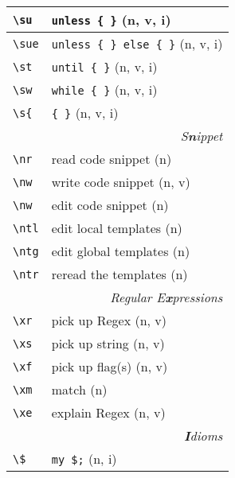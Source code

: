 \documentclass[oneside,10pt,landscape,DIV17]{scrartcl}
\begin{document}
\begin{multicols}{3}
\begin{center}
\begin{tabular}[]{|p{11mm}|p{58mm}|}
\hline \verb'\su'  & \verb'unless { }'                 \hfill (n, v, i)\\
\hline \verb'\sue' & \verb'unless { } else { }'        \hfill (n, v, i)\\
\hline \verb'\st'  & \verb'until { }'                  \hfill (n, v, i)\\
\hline \verb'\sw'  & \verb'while { }'                  \hfill (n, v, i)\\
\hline \verb'\s{'  & \verb'{ }'                        \hfill (n, v, i)\\
\hline
\hline
\multicolumn{2}{|r|}{\textsl{S\textbf{n}ippet}}             \\
\hline \verb'\nr'  & read code snippet         \hfill (n)   \\
\hline \verb'\nw'  & write code snippet        \hfill (n, v)\\
\hline \verb'\nw'  & edit code snippet         \hfill (n)   \\
%
\hline \verb'\ntl' & edit local templates      \hfill (n)   \\
\hline \verb'\ntg' & edit global templates     \hfill (n)   \\
\hline \verb'\ntr' & reread the templates      \hfill (n)   \\
\hline
\hline
\multicolumn{2}{|r|}{\textsl{Regular E\textbf{x}pressions}} \\
\hline \verb'\xr' &  pick up Regex             \hfill (n, v)\\
\hline \verb'\xs' &  pick up string            \hfill (n, v)\\
\hline \verb'\xf' &  pick up flag(s)           \hfill (n, v)\\
\hline \verb'\xm' &  match                     \hfill (n)   \\
\hline \verb'\xe' &  explain Regex             \hfill (n, v)\\
\hline
\hline
\multicolumn{2}{|r|}{\textsl{\textbf{I}dioms}}                 \\
\hline \verb'\$'   & \verb'my $;'              \hfill (n, i)   \\

\end{tabular}
\end{center}
\end{multicols}
\end{document}
